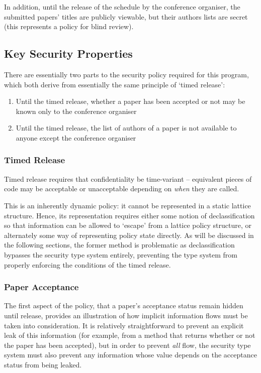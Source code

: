 In addition, until the release of the schedule by the conference organiser, the submitted papers' titles are publicly viewable, but their authors lists are secret (this represents a policy for blind review).

\subsection{Key Security Properties}

There are essentially two parts to the security policy required for this program, which both derive from essentially the same principle of `timed release':

\begin{enumerate}
	\item Until the timed release, whether a paper has been accepted or not may be known only to the conference organiser
	
	\item Until the timed release, the list of authors of a paper is not available to anyone except the conference organiser
\end{enumerate}

\subsubsection{Timed Release}

Timed release requires that confidentiality be time-variant -- equivalent pieces of code may be acceptable or unacceptable depending on \textit{when} they are called.

This is an inherently dynamic policy: it cannot be represented in a static lattice structure. Hence, its representation requires either some notion of declassification so that information can be allowed to `escape' from a lattice policy structure, or alternately some way of representing policy state directly. As will be discussed in the following sections, the former method is problematic as declassification bypasses the security type system entirely, preventing the type system from properly enforcing the conditions of the timed release.

\subsubsection{Paper Acceptance}

The first aspect of the policy, that a paper's acceptance status remain hidden until release, provides an illustration of how implicit information flows must be taken into consideration. It is relatively straightforward to prevent an explicit leak of this information (for example, from a method that returns whether or not the paper has been accepted), but in order to prevent \textit{all} flow, the security type system must also prevent any information whose value depends on the acceptance status from being leaked.

